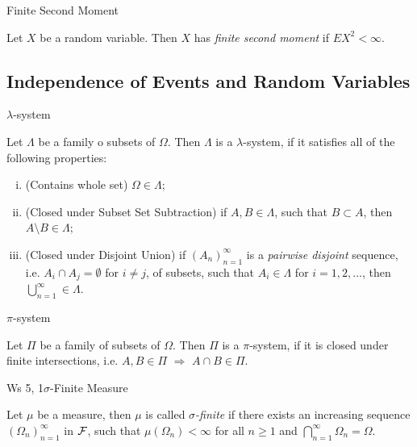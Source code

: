 \begin{definition}{}{Finite Second Moment}

    Let $X$ be a random variable. Then $X$ has \emph{finite second moment} if $EX^2 < \infty$.

\end{definition}


\subsection{Independence of Events and Random Variables}

\begin{definition}{6.5}{$\lambda$-system}

    Let $\Lambda$ be a family o subsets of $\Omega$. Then $\Lambda$ is a $\lambda$-system, if it satisfies all of the following properties:

        \begin{enumerate}[(i)]
            \item (Contains whole set) $\Omega \in \Lambda$;
            \item (Closed under Subset Set Subtraction) if $A, B \in \Lambda$, such that $B \subset A$, then $A \setminus B \in \Lambda$;
            \item (Closed under Disjoint Union) if $(A_n)_{n=1}^{\infty}$ is a \emph{pairwise disjoint} sequence, i.e. $A_i \cap A_j = \emptyset$ for $i \neq j$, of subsets, such that $A_i \in \Lambda$ for $i = 1,2,\hdots$, then $\bigcup_{n=1}^{\infty} \in \Lambda$.
        \end{enumerate}

\end{definition}

\begin{definition}{}{$\pi$-system}

    Let $\Pi$ be a family of subsets of $\Omega$. Then $\Pi$ is a $\pi$-system, if it is closed under finite intersections, i.e. $A,B \in \Pi$ $\Rightarrow$ $A \cap B \in \Pi$.

\end{definition}

\begin{definition}{Ws 5, 1}{$\sigma$-Finite Measure}

    Let $\mu$ be a measure, then $\mu$ is called \emph{$\sigma$-finite} if there exists an increasing sequence $(\Omega_n)_{n=1}^{\infty}$ in $\mathcal{F}$, such that $\mu(\Omega_n) < \infty$ for all $n \geq 1$ and $\bigcap_{n=1}^{\infty} \Omega_n = \Omega$.

\end{definition}

